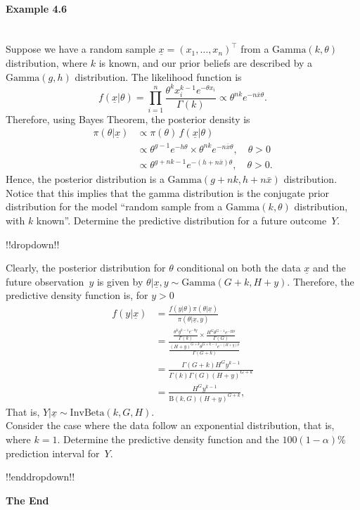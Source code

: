 \paragraph{Example 4.6}{~\\
  Suppose we have a random sample $\underline{x} = (x_1, \ldots, x_n)^\top$ from a $\mathrm{Gamma}(k,\theta)$
  distribution, where $k$ is known, and our prior beliefs are
  described by a $\mathrm{Gamma}(g,h)$ distribution. The likelihood function is
$$ f(\underline{x}|\theta)=\prod_{i=1}^n \frac{\theta^k x_i^{k-1}e^{-\theta x_i}}{\Gamma(k)}\propto\theta^{nk}e^{-n\bar x\theta}.$$
 Therefore, using Bayes Theorem, the posterior density is
 \begin{align*}
  \pi(\theta|\underline{x}) &\propto\pi(\theta)\,f(\underline{x}|\theta) \\
  &\propto\theta^{g-1}e^{-h\theta}\times\theta^{nk}e^{-n\bar x\theta}, \quad\theta>0 \\
  &\propto\theta^{g+nk-1}e^{-(h+n\bar x)\theta},\quad\theta>0.
\end{align*}
Hence, the posterior distribution is a $\mathrm{Gamma}(g+nk,h+n\bar x)$ distribution. Notice that this implies that the gamma distribution is the conjugate prior distribution for the model ``random sample from a $\mathrm{Gamma}(k,\theta)$ distribution, with $k$ known''. Determine the predictive distribution for a future outcome~$Y$.



\clearpage

!!dropdown!!

Clearly, the posterior distribution for $\theta$ conditional on both
    the data $\underline{x}$ and the future observation~$y$ is given by
    $\theta|\underline{x},y\sim \mathrm{Gamma}(G+k,H+y)$. Therefore, the predictive density
    function is, for $y>0$
    \begin{align*}
    f(y|\underline{x})&=\frac{f(y|\theta)\pi(\theta|\underline{x})}{\pi(\theta|\underline{x},y)}\\
    {}
    &=\frac{\frac{\theta^k y^{k-1}e^{-\theta y}}{\Gamma(k)}
    \times \frac{H^G\theta^{G-1}e^{-H\theta}}{\Gamma(G)}}
    {\frac{(H+y)^{G+k}\theta^{G+k-1}e^{-(H+y)\theta}}{\Gamma(G+k)}}\\
    {}
    &=\frac{\Gamma(G+k)H^Gy^{k-1}}{\Gamma(k)\Gamma(G)(H+y)^{G+k}}\\ 
    {}
    &=\frac{H^Gy^{k-1}}{\mathrm{B}(k,G)(H+y)^{G+k}},
    \end{align*}
    That is, $Y|\underline{x}\sim \mathrm{InvBeta}(k,G,H)$. \\ 
    Consider the case where the data follow an exponential distribution, that is, where $k=1$. Determine the predictive density function and the $100(1-\alpha)\%$ prediction interval for~$Y$.

!!enddropdown!!}

\clearpage

\thispagestyle{empty}
\vspace*{0.25\textheight}

\bfseries\fontsize{60pt}{60pt}\selectfont The End
